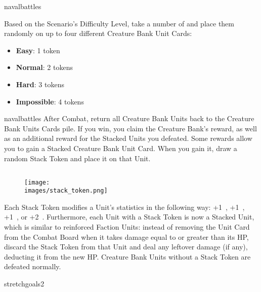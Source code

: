 \begin{expansion}[before=\vspace*{-11mm}]{navalbattles}
\begin{multicols*}{2}
  Based on the Scenario's Difficulty Level, take a number of  and place them randomly on up to four different Creature Bank Unit Cards:
  \begin{itemize}
    \item \textbf{Easy}: 1 token
    \item \textbf{Normal}: 2 tokens
    \item \textbf{Hard}: 3 tokens
    \item \textbf{Impossible}: 4 tokens
  \end{itemize}

  \end{multicols*}
\end{expansion}

\begin{multicols*}{2}
\begin{expansion}[before=\vspace*{-11mm}]{navalbattles}
  After Combat, return all Creature Bank Units back to the Creature Bank Units Cards pile.
  If you win, you claim the Creature Bank's reward, as well as an additional reward for the Stacked Units you defeated.
  Some rewards allow you to gain a Stacked Creature Bank Unit Card.
  When you gain it, draw a random Stack Token and place it on that Unit.

  \subsection*{}
  \setlength\intextsep{0pt}
  \setlength\columnsep{1em}
  \begin{wrapfigure}{r}{0.2\linewidth}
    \texttt{[image: \\images/stack\_token.png]}
  \end{wrapfigure}
  Each Stack Token modifies a Unit's statistics in the following way: +1~, +1~, +1~, or +2~.
  Furthermore, each Unit with a Stack Token is now a Stacked Unit, which is similar to reinforced Faction Units: instead of removing the Unit Card from the Combat Board when it takes damage equal to or greater than its HP, discard the Stack Token from that Unit and deal any leftover damage (if any), deducting it from the new HP.
  Creature Bank Units without a Stack Token are defeated normally.
\end{expansion}

\bigskip

\begin{expansion}{stretchgoals2}

\end{expansion}
\end{multicols*}
